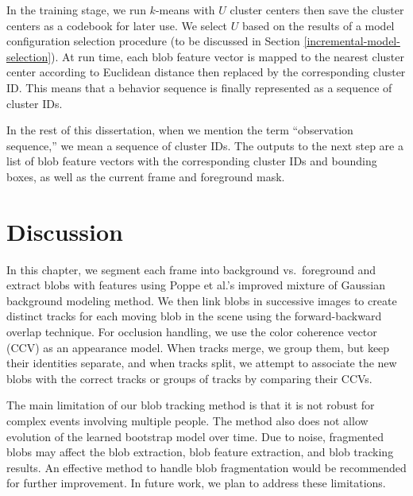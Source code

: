 In the training stage, we run $k$-means with $U$ cluster centers then
save the cluster centers as a codebook for later use. We select $U$
based on the results of a model configuration selection procedure (to
be discussed in Section \ref{incremental-model-selection}). At run
time, each blob feature vector is mapped to the nearest cluster center
according to Euclidean distance then replaced by the corresponding
cluster ID. This means that a behavior sequence is finally represented
as a sequence of cluster IDs.

In the rest of this dissertation, when we mention the term
``observation sequence,'' we mean a sequence of cluster IDs. The
outputs to the next step are a list of blob feature vectors with the
corresponding cluster IDs and bounding boxes, as well as the current 
frame and foreground mask.

\section{Discussion}
\label{sec:blob-discussion}

In this chapter, we segment each frame into background vs.\ foreground
and extract blobs with features using Poppe et al.'s improved mixture
of Gaussian background modeling method. We then link blobs in successive 
images to create distinct tracks for each moving blob in the scene using 
the forward-backward overlap technique. For occlusion handling, we use the 
color coherence vector (CCV) as an appearance model. When tracks merge, 
we group them, but keep their identities separate, and when tracks split, 
we attempt to associate the new blobs with the correct tracks or groups of 
tracks by comparing their CCVs.

The main limitation of our blob tracking method is that it is not
robust for complex events involving multiple people. The method also
does not allow evolution of the learned bootstrap model over time. 
Due to noise, fragmented blobs may affect the blob extraction, blob
feature extraction, and blob tracking results. An effective method to
handle blob fragmentation would be recommended for further
improvement.  In future work, we plan to address these limitations.

\FloatBarrier




